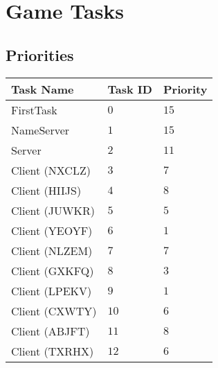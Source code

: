 \documentclass[12pt]{article}
\begin{document}
\section{Game Tasks}
\subsection{Priorities}
\begin{center}
  \begin{tabular}{|l|l|l|}
    \hline
    {\bf Task Name} & {\bf Task ID} & {\bf Priority} \\\hline
    FirstTask       & $0$  & $15$ \\\hline
    NameServer      & $1$  & $15$ \\\hline
    Server          & $2$  & $11$ \\\hline
    Client (NXCLZ)  & $3$  & $7$ \\\hline
    Client (HIIJS)  & $4$  & $8$ \\\hline
    Client (JUWKR)  & $5$  & $5$ \\\hline
    Client (YEOYF)  & $6$  & $1$ \\\hline
    Client (NLZEM)  & $7$  & $7$ \\\hline
    Client (GXKFQ)  & $8$  & $3$ \\\hline
    Client (LPEKV)  & $9$  & $1$ \\\hline
    Client (CXWTY)  & $10$ & $6$ \\\hline
    Client (ABJFT)  & $11$ & $8$ \\\hline
    Client (TXRHX)  & $12$ & $6$ \\\hline
  \end{tabular}
  \\
\end{center}
\end{document}
